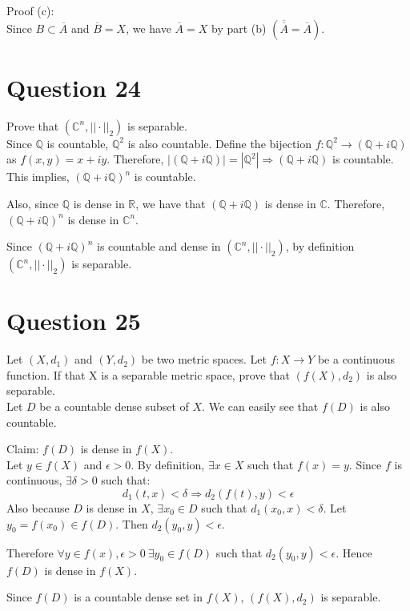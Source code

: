 \documentclass{article}
\begin{document}
	Proof (c): \\
	Since $B \subset \overline{A}$ and $\overline{B} = X$, we have $\overline{A} = X$ by part (b)
	$\left(\overline{\overline{A}} = \overline{A}\right)$.

\section{Question 24}

	Prove that $(\mathbb{C}^n, ||\cdot||_2)$ is separable. \\

	Since $\mathbb{Q}$ is countable, $\mathbb{Q}^2$ is also countable.
	Define the bijection $f: \mathbb{Q}^2 \to (\mathbb{Q} + i \mathbb{Q})$ as $f(x, y) = x + iy$.
	Therefore, $|(\mathbb{Q} + i \mathbb{Q})| = |\mathbb{Q}^2| \Rightarrow
	(\mathbb{Q} + i \mathbb{Q})$ is countable.
	This implies, $(\mathbb{Q} + i \mathbb{Q})^n$ is countable.

	Also, since $\mathbb{Q}$ is dense in $\mathbb{R}$, we have that $(\mathbb{Q} + i \mathbb{Q})$
	is dense in $\mathbb{C}$.
	Therefore, $(\mathbb{Q} + i \mathbb{Q})^n$ is dense in $\mathbb{C}^n$.

	Since $(\mathbb{Q} + i \mathbb{Q})^n$ is countable and dense in $(\mathbb{C}^n, ||\cdot||_2)$,
	by definition $(\mathbb{C}^n, ||\cdot||_2)$ is separable.

\section{Question 25}

	Let $(X, d_1)$ and $(Y, d_2)$ be two metric spaces.
	Let $f: X \to Y$ be a continuous function.
	If that X is a separable metric space, prove that $(f(X), d_2)$ is also separable. \\

	Let $D$ be a countable dense subset of $X$.
	We can easily see that $f(D)$ is also countable.

	Claim: $f(D)$ is dense in $f(X)$. \\
	Let $y \in f(X)$ and $\epsilon > 0$.
	By definition, $\exists x \in X$ such that $f(x) = y$.
	Since $f$ is continuous, $\exists \delta > 0$ such that:
	\[ d_1(t, x) < \delta \Rightarrow d_2(f(t), y) < \epsilon \]
	Also because $D$ is dense in $X$, $\exists x_0 \in D$ such that $d_1(x_0, x) < \delta$.
	Let $y_0 = f(x_0) \in f(D)$.
	Then $d_2(y_0, y) < \epsilon$.

	Therefore $\forall y \in f(x), \epsilon > 0 ~ \exists y_0 \in f(D)$ such that
	$d_2(y_0, y) < \epsilon$.
	Hence $f(D)$ is dense in $f(X)$.

	Since $f(D)$ is a countable dense set in $f(X)$, $(f(X), d_2)$ is separable.
\end{document}
